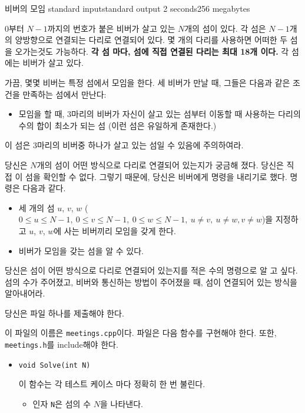 \begin{problem}{비버의 모임}
	{standard input}{standard output}
	{2 seconds}{256 megabytes}{}
	
	0부터 $N-1$까지의 번호가 붙은 비버가 살고 있는 $N$개의 섬이 있다. 각 섬은 $N-1$개의 양방향으로 연결되는 다리로 연결되어 있다. 몇 개의 다리를 사용하면 어떠한 두 섬을 오가는것도 가능하다. \textbf{각 섬 마다, 섬에 직접 연결된 다리는 최대 18개 이다.} 각 섬에는 비버가 살고 있다.
	
	가끔, 몇몇 비버는 특정 섬에서 모임을 한다. 세 비버가 만날 때, 그들은 다음과 같은 조건을 만족하는 섬에서 만난다:
	
	\begin{itemize}
	\item 모임을 할 때, 3마리의 비버가 자신이 살고 있는 섬부터 이동할 때 사용하는 다리의 수의 합이 최소가 되는 섬 (이런 섬은 유일하게 존재한다.)
	\end{itemize}
	
	이 섬은 3마리의 비버중 하나가 살고 있는 섬일 수 있음에 주의하여라.
	
	당신은 $N$개의 섬이 어떤 방식으로 다리로 연결되어 있는지가 궁금해 졌다. 당신은 직접 이 섬을 확인할 수 없다. 그렇기 때문에, 당신은 비버에게 명령을 내리기로 했다. 명령은 다음과 같다.
	
	\begin{itemize}
		\item 세 개의 섬 $u$, $v$, $w$ ($0 \le u \le N-1,\ 0 \le v \le N-1, \ 0 \le w \le N-1, \ u \ne v, \ u \ne w , v \ne w$)을 지정하고 $u$, $v$, $w$에 사는 비버끼리 모임을 갖게 한다.
		\item 비버가 모임을 갖는 섬을 알 수 있다.
	\end{itemize}

	당신은 섬이 어떤 방식으로 다리로 연결되어 있는지를 적은 수의 명령으로 알 고 싶다. 섬의 수가 주어졌고, 비버와 통신하는 방법이 주어졌을 때, 섬이 연결되어 있는 방식을 알아내어라.
	
	
	\Specification
	
	당신은 파일 하나를 제출해야 한다.
	
	이 파일의 이름은 \texttt{meetings.cpp}이다. 파일은 다음 함수를 구현해야 한다. 또한, \texttt{meetings.h}를 include해야 한다.
	
	\begin{itemize}
		\item \texttt{void Solve(int N)}
		
		이 함수는 각 테스트 케이스 마다 정확히 한 번 불린다.
		\begin{itemize}
			\item 인자 \texttt{N}은 섬의 수 $N$을 나타낸다.
		\end{itemize}
	

\end{itemize}
\end{problem}
